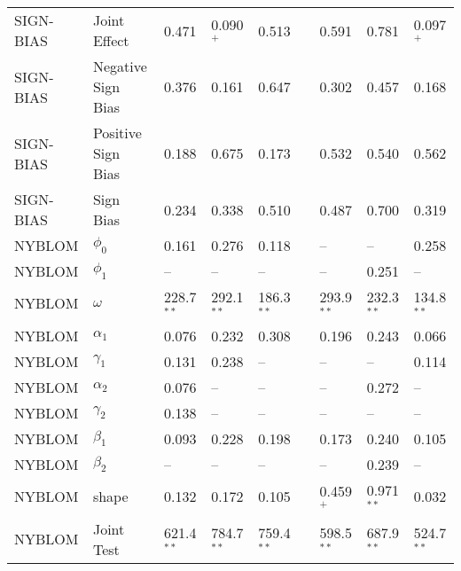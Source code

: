 \documentclass[12pt]{article}
\begin{document}
\begin{table}
\begin{tabular}[c]{l l l l l c l l l}
SIGN-BIAS &       Joint Effect & 0.471 & 0.090$^{+}$ & 0.513       & & 0.591       & 0.781       & 0.097$^{+}$ \\
SIGN-BIAS & Negative Sign Bias & 0.376 & 0.161       & 0.647       & & 0.302       & 0.457       & 0.168       \\
SIGN-BIAS & Positive Sign Bias & 0.188 & 0.675       & 0.173       & & 0.532       & 0.540       & 0.562       \\
SIGN-BIAS &          Sign Bias & 0.234 & 0.338       & 0.510       & & 0.487       & 0.700       & 0.319       \\
\midrule
   NYBLOM &         $\phi_{0}$ & 0.161        & 0.276        & 0.118        & &    --        &      --        &   0.258        \\
   NYBLOM &         $\phi_{1}$ &    --        &    --        &    --        & &    --        &   0.251        &      --        \\
   NYBLOM &         $\omega$   & 228.7$^{**}$ & 292.1$^{**}$ & 186.3$^{**}$ & & 293.9$^{**}$ &   232.3$^{**}$ &   134.8$^{**}$ \\
   NYBLOM &       $\alpha_{1}$ & 0.076        & 0.232        & 0.308        & & 0.196        &   0.243        &   0.066        \\
   NYBLOM &       $\gamma_{1}$ & 0.131        & 0.238        &    --        & &    --        &      --        &   0.114        \\
   NYBLOM &       $\alpha_{2}$ & 0.076        &    --        &    --        & &    --        &   0.272        &      --        \\
   NYBLOM &       $\gamma_{2}$ & 0.138        &    --        &    --        & &    --        &      --        &      --        \\
   NYBLOM &        $\beta_{1}$ & 0.093        & 0.228        & 0.198        & & 0.173        &   0.240        &   0.105        \\
   NYBLOM &        $\beta_{2}$ &    --        &    --        &    --        & &    --        &   0.239        &      --        \\
   NYBLOM &              shape & 0.132        & 0.172        & 0.105        & & 0.459$^{+}$  &   0.971$^{**}$ &   0.032        \\
   NYBLOM &         Joint Test & 621.4$^{**}$ & 784.7$^{**}$ & 759.4$^{**}$ & & 598.5$^{**}$ &   687.9$^{**}$ &   524.7$^{**}$ \\		 
\hline \hline
	\end{tabular}
	\begin{tablenotes}

\end{tablenotes}
\end{table}
\end{document}
